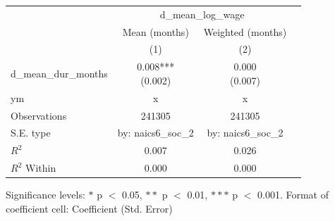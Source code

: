 \renewcommand\cellalign{t}
\begin{threeparttable}
\begin{tabular}{lccc}
\toprule
 & \multicolumn{2}{c}{d_mean_log_wage} \\
\cmidrule(lr){2-3} 
 & Mean (months) & Weighted (months) \\
 & (1) & (2) \\
\midrule
\addlinespace
d_mean_dur_months & \makecell{0.008*** \\ (0.002)} & \makecell{0.000 \\ (0.007)} \\
\midrule
\addlinespace
ym & x & x \\
\midrule
\addlinespace
Observations & 241305 & 241305 \\
S.E. type & by: naics6_soc_2 & by: naics6_soc_2 \\
$R^2$ & 0.007 & 0.026 \\
$R^2$ Within & 0.000 & 0.000 \\
\bottomrule
\end{tabular}
\footnotesize Significance levels: $*$ p $<$ 0.05, $**$ p $<$ 0.01, $***$ p $<$ 0.001. Format of coefficient cell: Coefficient 
 (Std. Error)
\end{threeparttable}